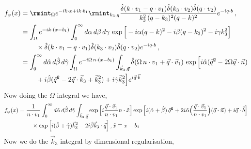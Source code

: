 \begin{align}
    \begin{split}
        f_{\varphi}(x)&=\rmint_{\Omega}e^{-i k\cdot x+i k\cdot b_{1}}\rmint_{k_3,q} \frac{\hat\delta(k\cdot v_1-q\cdot v_1)\hat\delta(k_3\cdot v_2)\hat\delta(q\cdot v_2)}{k_3^2 \, (q-k_3)^2(q-k)^2}e^{-i q\cdot b}\,,\\ &
        =\int_{\Omega}e^{-i k\cdot(x-b_1)}\int_{0}^\infty d\alpha\, d\beta\, d\gamma\, \exp\Big[-i\alpha (q-k)^2-i\beta(q-k_3)^2-i\gamma k_3^2 \Big]\\ &
        \hspace{0.8cm}\times  \hat\delta(k\cdot v_1-q\cdot v_1)\hat\delta(k_3\cdot v_2)\hat\delta(q\cdot v_2) e^{-iq\cdot b}\,,\\ &
=\int_{0}^{\infty}d\hat\alpha\,d\hat\beta\,d\hat\gamma \int_{\Omega}e^{-i\Omega \,n\cdot (x-b_1)}\int_{\vec k_3,\vec q}\hat\delta(\Omega\,n\cdot v_1+\vec q\cdot \vec v_1)\,\exp\Big[i\hat\alpha(\vec q^2-2\Omega \vec q\cdot \vec n)\\ &
\hspace{0.8cm}+i\hat\beta (\vec q^2-2\vec q\cdot \vec k_3+\vec k_3^2)+{i\hat\gamma \vec k_3^2}\Big]e^{i\vec q\cdot \vec b}
    \end{split}
\end{align}
Now doing the $\Omega $ integral we have,
\begin{align}
    \begin{split}
        f_{\varphi}(x)&=\frac{1}{n\cdot v_1}\int_{0}^{\infty}d\hat\alpha\,d\hat\beta\,d\hat\gamma \int_{\vec k_3,\vec q} \exp\Big[i\frac{\vec q\cdot \vec v_1}{n\cdot v_1}n\cdot \tilde x\Big]\exp\Big[i(\hat\alpha+\hat\beta)\,\vec q^2+2i\hat\alpha \Big(\frac{\vec q\cdot \vec v_1}{n\cdot v_1}\Big)(\vec q\cdot \vec n)+i\vec q\cdot \vec b\Big]\\ &
        \hspace{0.8cm}\times \exp\Big[i(\hat\beta+\hat\gamma)\vec k_3^2-2i\hat\beta \vec k_3\cdot \vec q\Big]\,,\Tilde{x}\equiv x-b_1
    \end{split}
\end{align}
Now we do the $\vec k_3$ integral by dimensional regularisation,
